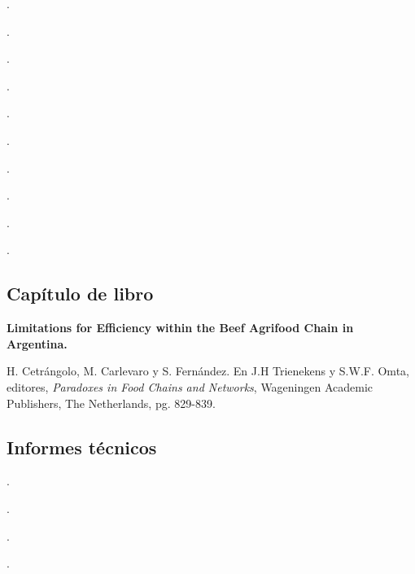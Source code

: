 \begin{etaremune}
\item {}.
\item {}.
\item {}.
\item {}.
\item {}.
\item {}.
\item {}.
\item {}.
\item {}.
\item {}.
\end{etaremune}


\subsection{Capítulo de libro}
\textbf{Limitations for Efficiency within the Beef Agrifood Chain in Argentina.}
 
 H. Cetrángolo, M. Carlevaro y S. Fernández. En J.H Trienekens y S.W.F. Omta, editores,  \textit{Paradoxes in Food Chains and Networks}, Wageningen Academic Publishers, The Netherlands, pg. 829-839.
 
 \subsection{Informes técnicos}
 \begin{etaremune}
 \item {} .
  \item {} .
  \item {} .
  \item {} . 
 \end{etaremune}

 
